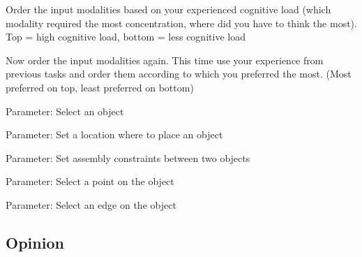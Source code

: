 \begin{question}{12}{Order the input modalities based on your experienced cognitive load (which modality required the most concentration, where did you have to think the most). Top = high cognitive load, bottom = less cognitive load}
\end{question}

Now order the input modalities again. This time use your experience from previous tasks and order them according to which you preferred the most. (Most preferred on top, least preferred on bottom)


\begin{question}{13}{Parameter: Select an object}
\end{question}


\begin{question}{14}{Parameter: Set a location where to place an object}
\end{question}


\begin{question}{15}{Parameter: Set assembly constraints between two objects}
\end{question}


\begin{question}{16}{Parameter: Select a point on the object}
\end{question}


\begin{question}{17}{Parameter: Select an edge on the object}
\end{question}

\subsection{Opinion}
\label{app:questionnaire_opinion}


